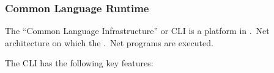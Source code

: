 %
%
%
%
%
%
%


\subsubsection[CLR]{Common Language Runtime}
The ``Common Language Infrastructure'' or CLI is a platform in .\ Net architecture on which the .\ Net programs are executed.

The CLI has the following key features:

